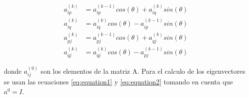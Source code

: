 \begin{align}
    a^{(k)}_{ip} & = a^{(k-1)}_{ip} cos(\theta) + a^{(k)}_{iq} sin(\theta) \label{eq:equation1} \\
    a^{(k)}_{iq} & = a^{(k)}_{iq} cos(\theta) - a^{(k-1)}_{ip} sin(\theta) \label{eq:equation2} \\
    a^{(k)}_{pj} & = a^{(k-1)}_{pj} cos(\theta) + a^{(k)}_{qj} sin(\theta)                      \\
    a^{(k)}_{qj} & = a^{(k)}_{qj} cos(\theta) - a^{(k-1)}_{pj} sin(\theta)
\end{align}

donde $a^{(0)}_{ij}$ son los elementos de la matriz A. Para el calculo de los eigenvectores se usan las ecuaciones \ref{eq:equation1} y \ref{eq:equation2} tomando en cuenta que $a^{0} = I$.

